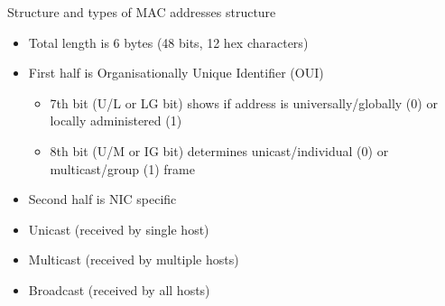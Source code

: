 \begin{frame}{Structure and types of MAC addresses}
	 structure\pause
	\begin{itemize}[<+->]
		\item Total length is 6 bytes (48 bits, 12 hex characters)
		\item First half is Organisationally Unique Identifier (OUI)
		\begin{itemize}
			\item 7th bit (U/L or LG bit) shows if address is universally/globally (0) or locally administered (1)
			\item 8th bit (U/M or IG bit) determines unicast/individual (0) or multicast/group (1) frame
		\end{itemize}
		\item Second half is NIC specific
	\end{itemize}
	\pause
	\begin{itemize}[<+->]
		\item Unicast (received by single host)
		\item Multicast (received by multiple hosts)
		\item Broadcast (received by all hosts)
	\end{itemize}
\end{frame}

